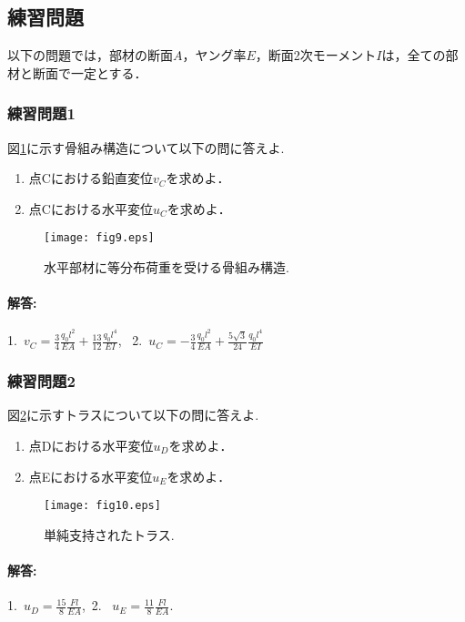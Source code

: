\documentclass[10pt,a4j]{jarticle}
\begin{document}
\subsection{練習問題}
以下の問題では，部材の断面$A$，ヤング率$E$，断面2次モーメント$I$は，全ての部材と断面で一定とする．
\subsubsection{練習問題1}
図\ref{fig:fig9}に示す骨組み構造について以下の問に答えよ. 
\begin{enumerate}
\item
	点Cにおける鉛直変位$v_C$を求めよ．
\item
	点Cにおける水平変位$u_C$を求めよ．
\end{enumerate}
\begin{figure}[h]
	\begin{center}
	\texttt{[image: fig9.eps]} 
	\end{center}
	\caption{水平部材に等分布荷重を受ける骨組み構造.} 
	\label{fig:fig9}
\end{figure}
\paragraph{解答:}
1.\ $v_C=\frac{3}{4}\frac{q_0l^2}{EA}+\frac{13}{12}\frac{q_0l^4}{EI}$, \,
2.\ $u_C=-\frac{3}{4}\frac{q_0l^2}{EA}+\frac{5\sqrt{3}}{24}\frac{q_0l^4}{EI}$
%
\subsubsection{練習問題2}
図\ref{fig:fig10}に示すトラスについて以下の問に答えよ. 
\begin{enumerate}
\item
	点Dにおける水平変位$u_D$を求めよ．
\item
	点Eにおける水平変位$u_E$を求めよ．
\end{enumerate}
\begin{figure}[h]
	\begin{center}
	\texttt{[image: fig10.eps]} 
	\end{center}
	\caption{単純支持されたトラス.} 
	\label{fig:fig10}
\end{figure}
\paragraph{解答:}
1.\ $u_D=\frac{15}{8}\frac{Fl}{EA}$,\, 2. \ $u_E=\frac{11}{8}\frac{Fl}{EA}$.
\end{document}
